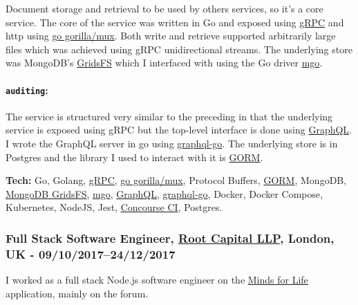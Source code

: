 \documentclass[
  a4paper,
]{article}
\begin{document}
\begin{multicols*}{2}
Document storage and retrieval to be used by others services, so it's a
core service. The core of the service was written in Go and exposed
using \href{https://grpc.io/}{gRPC} and http using
\href{https://github.com/gorilla/mux}{go gorilla/mux}. Both write and
retrieve supported arbitrarily large files which was achieved using gRPC
unidirectional streams. The underlying store was MongoDB's
\href{https://docs.mongodb.com/manual/core/gridfs/}{GridsFS} which I
interfaced with using the Go driver \href{https://gopkg.in/mgo.v2}{mgo}.

\hypertarget{auditing}{%
\paragraph{\texorpdfstring{\textbf{\texttt{auditing}}:}{auditing:}}\label{auditing}}

The service is structured very similar to the preceding in that the
underlying service is exposed using gRPC but the top-level interface is
done using \href{graphql.org}{GraphQL}. I wrote the GraphQL server in go
using \href{https://github.com/graph-gophers/graphql-go}{graphql-go}.
The underlying store is in Postgres and the library I used to interact
with it is \href{http://gorm.io/}{GORM}.

\textbf{Tech:} Go, Golang, \href{https://grpc.io/}{gRPC},
\href{https://github.com/gorilla/mux}{go gorilla/mux}, Protocol Buffers,
\href{http://gorm.io/}{GORM}, MongoDB,
\href{https://docs.mongodb.com/manual/core/gridfs/}{MongoDB GridsFS},
\href{https://gopkg.in/mgo.v2}{mgo}, \href{graphql.org}{GraphQL},
\href{https://github.com/graph-gophers/graphql-go}{graphql-go}, Docker,
Docker Compose, Kubernetes, NodeJS, Jest,
\href{https://concourse-ci.org/}{Concourse CI}, Postgres.

\hypertarget{full-stack-software-engineer-root-capital-llp-london-uk---0910201724122017}{%
\subsubsection{\texorpdfstring{Full Stack Software Engineer,
\href{https://www.rootcapital.co.uk}{Root Capital LLP}, London, UK -
09/10/2017--24/12/2017}{Full Stack Software Engineer, Root Capital LLP, London, UK - 09/10/2017--24/12/2017}}\label{full-stack-software-engineer-root-capital-llp-london-uk---0910201724122017}}

I worked as a full stack Node.js software engineer on the
\href{https://mindsforlife.com/}{Minds for Life} application, mainly on
the forum.


\end{multicols*}
\end{document}
